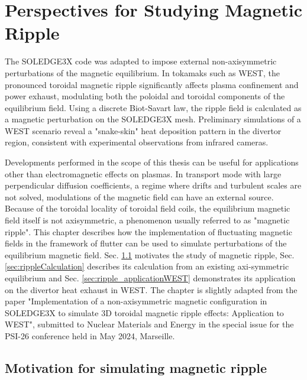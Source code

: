\chapter{Perspectives for Studying Magnetic Ripple}
\label{chap:RippleMagnetic}


\begin{chaptersummarybox}
	The SOLEDGE3X code was adapted to impose external non-axisymmetric perturbations of the magnetic equilibrium. In tokamaks such as WEST, the pronounced toroidal magnetic ripple significantly affects plasma confinement and power exhaust, modulating both the poloidal and toroidal components of the equilibrium field. Using a discrete Biot-Savart law, the ripple field is calculated as a magnetic perturbation on the SOLEDGE3X mesh. Preliminary simulations of a WEST scenario reveal a "snake-skin" heat deposition pattern in the divertor region, consistent with experimental observations from infrared cameras.
\end{chaptersummarybox}

\newpage


Developments performed in the scope of this thesis can be useful for applications other than electromagnetic effects on plasmas. In transport mode with large perpendicular diffusion coefficients, a regime where drifts and turbulent scales are not solved, modulations of the magnetic field can have an external source. Because of the toroidal locality of toroidal field coils, the equilibrium magnetic field itself is not axisymmetric, a phenomenon usually referred to as "magnetic ripple". This chapter describes how the implementation of fluctuating magnetic fields in the framework of flutter can be used to simulate perturbations of the equilibrium magnetic field. Sec. \ref{sec:ripple_intro} motivates the study of magnetic ripple, Sec. \ref{sec:rippleCalculation} describes its calculation from an existing axi-symmetric equilibrium and Sec. \ref{sec:ripple_applicationWEST} demonstrates its application on the divertor heat exhaust in WEST. The chapter is slightly adapted from the paper "Implementation of a non-axisymmetric magnetic configuration in SOLEDGE3X to simulate 3D toroidal magnetic ripple effects: Application to WEST", submitted to Nuclear Materials and Energy in the special issue for the PSI-26 conference held in May 2024, Marseille.


\section{Motivation for simulating magnetic ripple}
\label{sec:ripple_intro}

